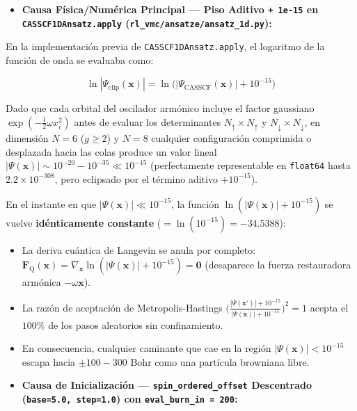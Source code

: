 \documentclass[10pt,a4paper]{article}
\begin{document}
\begin{itemize}
\item \textbf{Causa Física/Numérica Principal --- Piso Aditivo \texttt{+ 1e-15} en \texttt{CASSCF1DAnsatz.apply} (\texttt{rl\_vmc/ansatze/ansatz\_1d.py}):}
\end{itemize}

   En la implementación previa de \texttt{CASSCF1DAnsatz.apply}, el logaritmo de la función de onda se evaluaba como:

\[
   \ln |\Psi_{\mathrm{clip}}(\mathbf{x})| = \ln\!\big(|\Psi_{\mathrm{CASSCF}}(\mathbf{x})| + 10^{-15}\big)
\]

   Dado que cada orbital del oscilador armónico incluye el factor gaussiano $\exp(-\frac{1}{2}\omega x_i^2)$ antes de evaluar los determinantes $N_\uparrow \times N_\uparrow$ y $N_\downarrow \times N_\downarrow$, en dimensión $N=6$ ($g \ge 2$) y $N=8$ cualquier configuración comprimida o desplazada hacia las colas produce un valor lineal $|\Psi(\mathbf{x})| \sim 10^{-20} - 10^{-35} \ll 10^{-15}$ (perfectamente representable en \texttt{float64} hasta $2.2 \times 10^{-308}$, pero eclipsado por el término aditivo $+10^{-15}$).

   En el instante en que $|\Psi(\mathbf{x})| \ll 10^{-15}$, la función $\ln(|\Psi(\mathbf{x})| + 10^{-15})$ se vuelve \textbf{idénticamente constante} ($= \ln(10^{-15}) = -34.5388$):

\begin{itemize}
\item La deriva cuántica de Langevin se anula por completo: $\mathbf{F}_{\mathrm{Q}}(\mathbf{x}) = \nabla_{\mathbf{x}} \ln(|\Psi(\mathbf{x})| + 10^{-15}) = \mathbf{0}$ (desaparece la fuerza restauradora armónica $-\omega \mathbf{x}$).
\item La razón de aceptación de Metropolis-Hastings $\big(\frac{|\Psi(\mathbf{x}')| + 10^{-15}}{|\Psi(\mathbf{x})| + 10^{-15}}\big)^2 = 1$ acepta el $100\%$ de los pasos aleatorios sin confinamiento.
\item En consecuencia, cualquier caminante que cae en la región $|\Psi(\mathbf{x})| < 10^{-15}$ escapa hacia $\pm 100 - 300\text{ Bohr}$ como una partícula browniana libre.
\end{itemize}



\begin{itemize}
\item \textbf{Causa de Inicialización --- \texttt{spin\_ordered\_offset} Descentrado (\texttt{base=5.0, step=1.0}) con \texttt{eval\_burn\_in = 200}:}
\end{itemize}
\end{document}
